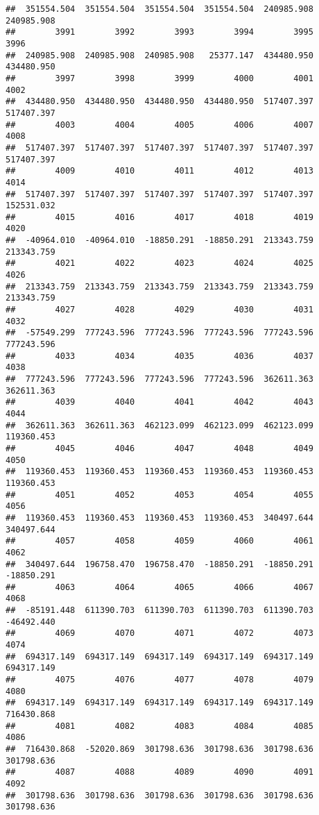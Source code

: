 \documentclass[
]{book}
\begin{document}
\begin{verbatim}
##  351554.504  351554.504  351554.504  351554.504  240985.908  240985.908 
##        3991        3992        3993        3994        3995        3996 
##  240985.908  240985.908  240985.908   25377.147  434480.950  434480.950 
##        3997        3998        3999        4000        4001        4002 
##  434480.950  434480.950  434480.950  434480.950  517407.397  517407.397 
##        4003        4004        4005        4006        4007        4008 
##  517407.397  517407.397  517407.397  517407.397  517407.397  517407.397 
##        4009        4010        4011        4012        4013        4014 
##  517407.397  517407.397  517407.397  517407.397  517407.397  152531.032 
##        4015        4016        4017        4018        4019        4020 
##  -40964.010  -40964.010  -18850.291  -18850.291  213343.759  213343.759 
##        4021        4022        4023        4024        4025        4026 
##  213343.759  213343.759  213343.759  213343.759  213343.759  213343.759 
##        4027        4028        4029        4030        4031        4032 
##  -57549.299  777243.596  777243.596  777243.596  777243.596  777243.596 
##        4033        4034        4035        4036        4037        4038 
##  777243.596  777243.596  777243.596  777243.596  362611.363  362611.363 
##        4039        4040        4041        4042        4043        4044 
##  362611.363  362611.363  462123.099  462123.099  462123.099  119360.453 
##        4045        4046        4047        4048        4049        4050 
##  119360.453  119360.453  119360.453  119360.453  119360.453  119360.453 
##        4051        4052        4053        4054        4055        4056 
##  119360.453  119360.453  119360.453  119360.453  340497.644  340497.644 
##        4057        4058        4059        4060        4061        4062 
##  340497.644  196758.470  196758.470  -18850.291  -18850.291  -18850.291 
##        4063        4064        4065        4066        4067        4068 
##  -85191.448  611390.703  611390.703  611390.703  611390.703  -46492.440 
##        4069        4070        4071        4072        4073        4074 
##  694317.149  694317.149  694317.149  694317.149  694317.149  694317.149 
##        4075        4076        4077        4078        4079        4080 
##  694317.149  694317.149  694317.149  694317.149  694317.149  716430.868 
##        4081        4082        4083        4084        4085        4086 
##  716430.868  -52020.869  301798.636  301798.636  301798.636  301798.636 
##        4087        4088        4089        4090        4091        4092 
##  301798.636  301798.636  301798.636  301798.636  301798.636  301798.636 

\end{verbatim}
\end{document}
